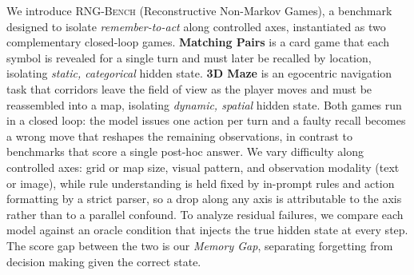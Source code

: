 \documentclass{llmxive}
\providecommand{\benchname}{\textsc{RNG-Bench}\xspace}
\begin{document}
We introduce \benchname{} (Reconstructive Non-Markov Games), a benchmark designed to isolate \emph{remember-to-act} along controlled axes, instantiated as two complementary closed-loop games. \textbf{Matching Pairs} is a card game that each symbol is revealed for a single turn and must later be recalled by location, isolating \emph{static, categorical} hidden state. \textbf{3D Maze} is an egocentric navigation task that corridors leave the field of view as the player moves and must be reassembled into a map, isolating \emph{dynamic, spatial} hidden state. Both games run in a closed loop: the model issues one action per turn and a faulty recall becomes a wrong move that reshapes the remaining observations, in contrast to benchmarks that score a single post-hoc answer. We vary difficulty along controlled axes: grid or map size, visual pattern, and observation modality (text or image), while rule understanding is held fixed by in-prompt rules and action formatting by a strict parser, so a drop along any axis is attributable to the axis rather than to a parallel confound. To analyze residual failures, we compare each model against an oracle condition that injects the true hidden state at every step. The score gap between the two is our \emph{Memory Gap}, separating forgetting from decision making given the correct state.
\end{document}
